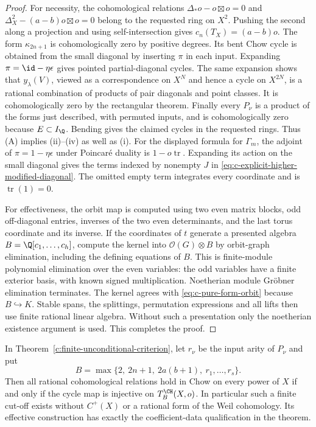 \begin{proof}
For necessity, the cohomological relations
$\Delta_*o-o\boxtimes o=0$ and
$\Delta_X^2-(a-b)o\boxtimes o=0$ belong to the requested ring
on $X^2$.  Pushing the second along a projection and using
self-intersection gives $c_n(T_X)=(a-b)o$.  The form
$\kappa_{2n+1}$ is cohomologically zero by positive degrees.
Its bent Chow cycle is obtained from the small diagonal by
inserting $\pi$ in each input.  Expanding
$\pi=\id-\eta\epsilon$ gives pointed partial-diagonal cycles.
The same expansion shows that $y_\lambda(V)$, viewed as a
correspondence on $X^N$ and hence a cycle on $X^{2N}$, is a
rational combination of products of pair diagonals and point
classes.  It is cohomologically zero by the rectangular theorem.
Finally every $P_\nu$ is a product of the forms just described,
with permuted inputs, and is cohomologically zero because
$E\subset I_\Q$.  Bending gives the claimed cycles in the
requested rings.  Thus (A) implies (ii)--(iv) as well as (i).
For the displayed formula for $\Gamma_m$, the adjoint of
$\pi=1-\eta\epsilon$ under Poincar\'e duality is
$1-o\operatorname{tr}$.  Expanding its action on the small
diagonal gives the terms indexed by nonempty $J$ in
\eqref{eq:c-explicit-higher-modified-diagonal}.  The omitted empty
term integrates every coordinate and is
$\operatorname{tr}(1)=0$.

For effectiveness, the orbit map is computed using two even
matrix blocks, odd off-diagonal entries, inverses of the two
even determinants, and the last torus coordinate and its inverse.
If the coordinates of $t$ generate a presented algebra
$B=\Q[c_1,\ldots,c_h]$, compute the kernel into
$\mathcal O(G)\otimes B$ by orbit-graph elimination, including
the defining equations of $B$.  This is finite-module
polynomial elimination over the even variables: the odd
variables have a finite exterior basis, with known signed
multiplication.  Noetherian module Gr\"obner elimination
terminates.  The kernel agrees with \eqref{eq:c-pure-form-orbit}
because $B\hookrightarrow K$.  Stable spans, the splittings,
permutation expressions and all lifts then use finite rational
linear algebra.  Without such a presentation only the
noetherian existence argument is used.  This completes the proof.
\end{proof}

\begin{corollary}
\label{c:finite-power-cutoff}
In Theorem~\ref{c:finite-unconditional-criterion}, let $r_\nu$
be the input arity of $P_\nu$ and put
\[
 B=\max\{2,\ 2n+1,\ 2a(b+1),\ r_1,\ldots,r_s\}.
\]
Then all rational cohomological relations hold in Chow on every
power of $X$ if and only if the cycle map is injective on
$T_B^{\CH}(X,o)$.  In particular such a finite cut-off exists
without $C^+(X)$ or a rational form of the Weil cohomology.
Its effective construction has exactly the coefficient-data
qualification in the theorem.
\end{corollary}

